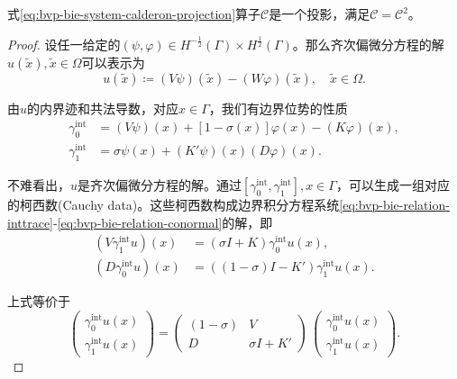 \begin{lemma}[卡尔德隆投影]
  式\eqref{eq:bvp-bie-system-calderon-projection}算子$\mathcal{C}$是一个投影，满足$\mathcal{C} = \mathcal{C}^2$。
\end{lemma}
\begin{proof}
  设任一给定的$\left(\psi, \varphi \right) \in H^{-\frac{1}{2}}(\Gamma) \times H^{\frac{1}{2}}(\Gamma)$。那么齐次偏微分方程的解$u(\widetilde{x}), \widetilde{x} \in \Omega$可以表示为
  \begin{equation*}
    u \left( \widetilde{x} \right)
    \coloneqq \left( V \psi \right) (\widetilde{x})
    -\left( W \varphi \right) (\widetilde{x}), \quad \widetilde{x} \in \Omega.
  \end{equation*}

由$u$的内界迹和共法导数，对应$x \in \Gamma$，我们有边界位势的性质
\begin{equation*}
  \begin{split}
    \gamma_{0}^{\text{int}} &= \left( V \psi \right) (x)
    + \left[ 1 - \sigma(x) \right] \varphi(x) - \left(K \varphi \right)(x), \\
    \gamma_{1}^{\text{int}} &= \sigma \psi(x) + \left(K' \psi \right) (x)  \left( D \varphi \right)(x).
  \end{split}
\end{equation*}

不难看出，$u$是齐次偏微分方程的解。通过$\left[\gamma_{0}^{\text{int}}, \gamma_{1}^{\text{int}} \right], x \in \Gamma$，可以生成一组对应的柯西数(Cauchy data)。这些柯西数构成边界积分方程系统\eqref{eq:bvp-bie-relation-inttrace}-\eqref{eq:bvp-bie-relation-conormal}的解，即
\begin{equation}
  \label{eq:bvp-bie-system-solution}
\begin{split}
  \left( V \gamma_{1}^{\text{int}} u \right)(x) & =
  \left( \sigma I + K \right) \gamma_{0}^{\text{int}} u(x), \\
  \left( D \gamma_{0}^{\text{int}} u \right)(x) & =
  \left( \left(1 - \sigma \right) I - K' \right) \gamma_{1}^{\text{int}} u(x).
\end{split}
\end{equation}

上式等价于
\begin{equation}
  \label{eq:bvp-bie-system-solution-matrix}
  \begin{pmatrix}
    \gamma_{0}^{\text{int}} u(x) \\
    \gamma_{1}^{\text{int}} u(x)
  \end{pmatrix}
  =
  \begin{pmatrix}
    \left( 1-\sigma \right) & V \\
    D & \sigma I + K'
  \end{pmatrix}
  \,
  \begin{pmatrix}
    \gamma_{0}^{\text{int}} u(x) \\
    \gamma_{1}^{\text{int}} u(x)
  \end{pmatrix}.
\end{equation}


\end{proof}
